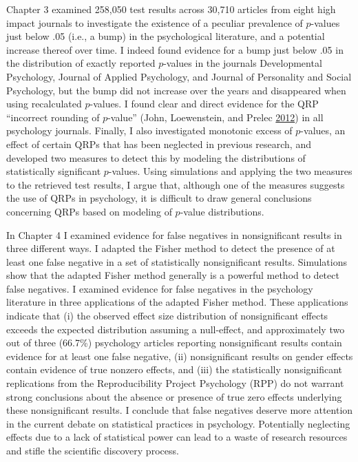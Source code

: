 \documentclass[a5paper]{book}
\begin{document}
Chapter 3 examined 258,050 test results across 30,710 articles from
eight high impact journals to investigate the existence of a peculiar
prevalence of \(p\)-values just below .05 (i.e., a bump) in the
psychological literature, and a potential increase thereof over time. I
indeed found evidence for a bump just below .05 in the distribution of
exactly reported \(p\)-values in the journals Developmental Psychology,
Journal of Applied Psychology, and Journal of Personality and Social
Psychology, but the bump did not increase over the years and disappeared
when using recalculated \(p\)-values. I found clear and direct evidence
for the QRP \enquote{incorrect rounding of \(p\)-value} (John,
Loewenstein, and Prelec
\protect\hyperlink{ref-doi:10.1177ux2f0956797611430953}{2012}) in all
psychology journals. Finally, I also investigated monotonic excess of
\(p\)-values, an effect of certain QRPs that has been neglected in
previous research, and developed two measures to detect this by modeling
the distributions of statistically significant \(p\)-values. Using
simulations and applying the two measures to the retrieved test results,
I argue that, although one of the measures suggests the use of QRPs in
psychology, it is difficult to draw general conclusions concerning QRPs
based on modeling of \(p\)-value distributions.

In Chapter 4 I examined evidence for false negatives in nonsignificant
results in three different ways. I adapted the Fisher method to detect
the presence of at least one false negative in a set of statistically
nonsignificant results. Simulations show that the adapted Fisher method
generally is a powerful method to detect false negatives. I examined
evidence for false negatives in the psychology literature in three
applications of the adapted Fisher method. These applications indicate
that (i) the observed effect size distribution of nonsignificant effects
exceeds the expected distribution assuming a null-effect, and
approximately two out of three (66.7\%) psychology articles reporting
nonsignificant results contain evidence for at least one false negative,
(ii) nonsignificant results on gender effects contain evidence of true
nonzero effects, and (iii) the statistically nonsignificant replications
from the Reproducibility Project Psychology (RPP) do not warrant strong
conclusions about the absence or presence of true zero effects
underlying these nonsignificant results. I conclude that false negatives
deserve more attention in the current debate on statistical practices in
psychology. Potentially neglecting effects due to a lack of statistical
power can lead to a waste of research resources and stifle the
scientific discovery process.
\end{document}

